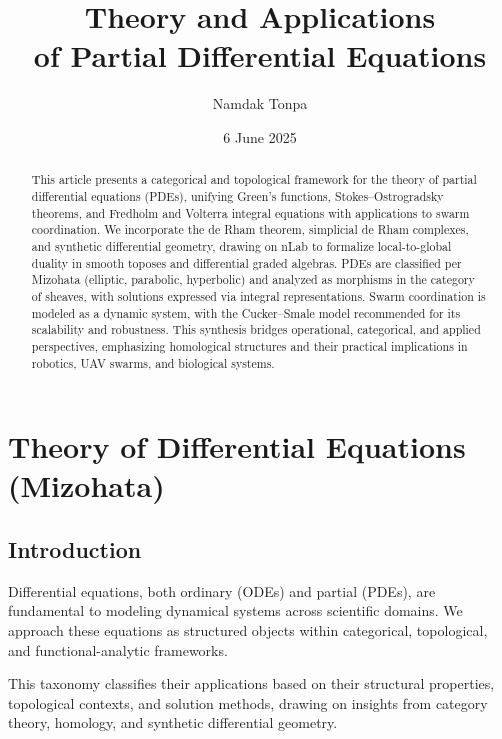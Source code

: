 \documentclass{article}
\theoremstyle{plain}
\begin{document}
\title{Theory and Applications \\ of Partial Differential Equations}
\author{Namdak Tonpa}
\date{6 June 2025}
\maketitle

\begin{abstract}
This article presents a categorical and topological framework for the theory
of partial differential equations (PDEs), unifying Green's functions,
Stokes--Ostrogradsky theorems, and Fredholm and Volterra integral
equations with applications to swarm coordination. We incorporate
the de Rham theorem, simplicial de Rham complexes,
and synthetic differential geometry, drawing on nLab to formalize
local-to-global duality in smooth toposes and differential graded algebras.
PDEs are classified per Mizohata (elliptic, parabolic, hyperbolic) and
analyzed as morphisms in the category of sheaves, with solutions expressed
via integral representations. Swarm coordination is modeled as a dynamic
system, with the Cucker--Smale model recommended for its scalability and
robustness. This synthesis bridges operational, categorical, and applied
perspectives, emphasizing homological structures and their practical
implications in robotics, UAV swarms, and biological systems.
\end{abstract}


\tableofcontents

\section{Theory of Differential Equations (Mizohata)}

\subsection{Introduction}

Differential equations, both ordinary (ODEs) and partial (PDEs),
are fundamental to modeling dynamical systems across scientific domains.
We approach these equations as structured objects within categorical,
topological, and functional-analytic frameworks.

This taxonomy classifies their applications based on their structural properties,
topological contexts, and solution methods, drawing on insights from category theory,
homology, and synthetic differential geometry.
\end{document}
